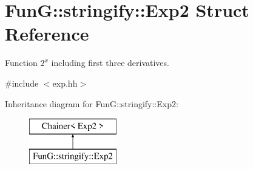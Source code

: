\hypertarget{structFunG_1_1stringify_1_1Exp2}{\section{Fun\-G\-:\-:stringify\-:\-:Exp2 Struct Reference}
\label{structFunG_1_1stringify_1_1Exp2}
}


Function $2^x$ including first three derivatives.  




{\ttfamily \#include $<$exp.\-hh$>$}

Inheritance diagram for Fun\-G\-:\-:stringify\-:\-:Exp2\-:\begin{figure}[H]
\begin{center}
\leavevmode
\includegraphics[height=2.000000cm]{structFunG_1_1stringify_1_1Exp2}
\end{center}
\end{figure}

